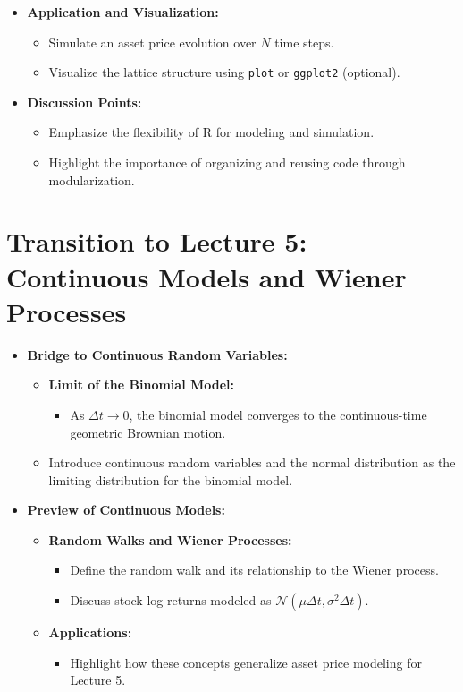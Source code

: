 \documentclass[12pt]{article}
\begin{document}
\begin{itemize}
\begin{itemize}
		\end{itemize}
		\item \textbf{Application and Visualization:}
		\begin{itemize}
			\item Simulate an asset price evolution over $N$ time steps.
			\item Visualize the lattice structure using \texttt{plot} or \texttt{ggplot2} (optional).
		\end{itemize}
		\item \textbf{Discussion Points:}
		\begin{itemize}
			\item Emphasize the flexibility of R for modeling and simulation.
			\item Highlight the importance of organizing and reusing code through modularization.
		\end{itemize}
	\end{itemize}
	
	\section*{Transition to Lecture 5: Continuous Models and Wiener Processes}
	\begin{itemize}
		\item \textbf{Bridge to Continuous Random Variables:}
		\begin{itemize}
			\item \textbf{Limit of the Binomial Model:}
			\begin{itemize}
				\item As $\Delta t \to 0$, the binomial model converges to the continuous-time geometric Brownian motion.
			\end{itemize}
			\item Introduce continuous random variables and the normal distribution as the limiting distribution for the binomial model.
		\end{itemize}
		\item \textbf{Preview of Continuous Models:}
		\begin{itemize}
			\item \textbf{Random Walks and Wiener Processes:}
			\begin{itemize}
				\item Define the random walk and its relationship to the Wiener process.
				\item Discuss stock log returns modeled as $\mathcal{N}(\mu \Delta t, \sigma^2 \Delta t)$.
			\end{itemize}
			\item \textbf{Applications:}
			\begin{itemize}
				\item Highlight how these concepts generalize asset price modeling for Lecture 5.
			\end{itemize}
		\end{itemize}
	\end{itemize}
	
\end{document}
